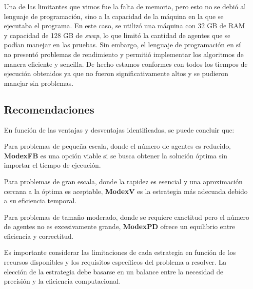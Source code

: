 \documentclass[letterpaper,10pt]{article}
\begin{document}
Una de las limitantes que vimos fue la falta de memoria, pero esto no se debió al lenguaje de programación, sino a la capacidad de la máquina en la que se ejecutaba el programa. En este caso, se utilizó una máquina con 32 GB de RAM y capacidad de 128 GB de \textit{swap}, lo que limitó la cantidad de agentes que se podían manejar en las pruebas. Sin embargo, el lenguaje de programación en sí no presentó problemas de rendimiento y permitió implementar los algoritmos de manera eficiente y sencilla. De hecho estamos conformes con todos los tiempos de ejecución obtenidos ya que no fueron significativamente altos y se pudieron manejar sin problemas.
\subsection{Recomendaciones}

En función de las ventajas y desventajas identificadas, se puede concluir que:

Para problemas de pequeña escala, donde el número de agentes es reducido, \textbf{ModexFB} es una opción viable si se busca obtener la solución óptima sin importar el tiempo de ejecución.

Para problemas de gran escala, donde la rapidez es esencial y una aproximación cercana a la óptima es aceptable, \textbf{ModexV} es la estrategia más adecuada debido a su eficiencia temporal.

Para problemas de tamaño moderado, donde se requiere exactitud pero el número de agentes no es excesivamente grande, \textbf{ModexPD} ofrece un equilibrio entre eficiencia y correctitud.

Es importante considerar las limitaciones de cada estrategia en función de los recursos disponibles y los requisitos específicos del problema a resolver. La elección de la estrategia debe basarse en un balance entre la necesidad de precisión y la eficiencia computacional.
\end{document}

